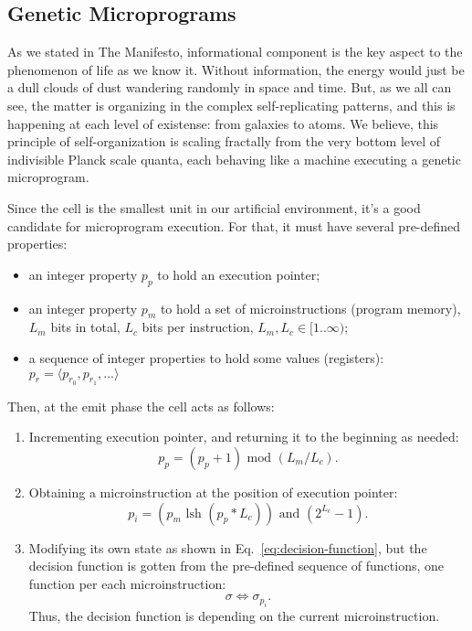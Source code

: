 \documentclass[a4paper,12pt,tikz,UTF8]{article}
\begin{document}
  \subsection{Genetic Microprograms}

    As we stated in The Manifesto, informational component is the key aspect to the phenomenon of life as we know it. Without information, the energy would just be a dull clouds of dust wandering randomly in space and time. But, as we all can see, the matter is organizing in the complex self-replicating patterns, and this is happening at each level of existense: from galaxies to atoms. We believe, this principle of self-organization is scaling fractally from the very bottom level of indivisible Planck scale quanta, each behaving like a machine executing a genetic microprogram.

    Since the cell is the smallest unit in our artificial environment, it's a good candidate for microprogram execution. For that, it must have several pre-defined properties:
    \begin{itemize}
      \item an integer property $p_p$ to hold an execution pointer;
      \item an integer property $p_m$ to hold a set of microinstructions (program memory), $L_m$ bits in total, $L_c$ bits per instruction, $L_m, L_c \in {[1 .. \infty)}$;
      \item a sequence of integer properties to hold some values (registers): $p_r = \langle p_{r_0}, p_{r_1}, ... \rangle$ 
    \end{itemize}

    Then, at the emit phase the cell acts as follows:
    \begin{enumerate}
      \item Incrementing execution pointer, and returning it to the beginning as needed:
        \begin{equation}
          p_p = (p_p + 1) \text{ mod } (L_m / L_c).
        \end{equation}
      \item Obtaining a microinstruction at the position of execution pointer:
        \begin{equation}
          p_i = (p_m \text{ lsh } (p_p * L_c)) \text{ and } (2^{L_c} - 1).
        \end{equation}
      \item Modifying its own state as shown in Eq.~\ref{eq:decision-function}, but the decision function is gotten from the pre-defined sequence of functions, one function per each microinstruction:
        \begin{equation}
          \sigma \Leftrightarrow \sigma_{p_i}.
        \end{equation}
        Thus, the decision function is depending on the current microinstruction.
    \end{enumerate}
\end{document}
